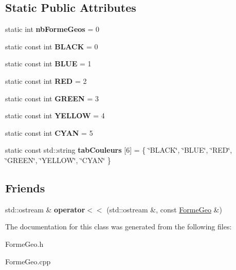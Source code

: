 \subsection*{Static Public Attributes}
\begin{DoxyCompactItemize}
\item 
\mbox{\label{class_forme_geo_a7def7d58284e2bcebd42da550aabed61}} 
static int {\bfseries nb\+Forme\+Geos} = 0
\item 
\mbox{\label{class_forme_geo_aaa9f666214acae24187d728f9b360604}} 
static const int {\bfseries B\+L\+A\+CK} = 0
\item 
\mbox{\label{class_forme_geo_a683d564c4ed1425a75efab32702c87db}} 
static const int {\bfseries B\+L\+UE} = 1
\item 
\mbox{\label{class_forme_geo_aa62b26e133ed4bb5d5ff06a453b616d8}} 
static const int {\bfseries R\+ED} = 2
\item 
\mbox{\label{class_forme_geo_af58c1c56fa63e46d4fb5860deb186c14}} 
static const int {\bfseries G\+R\+E\+EN} = 3
\item 
\mbox{\label{class_forme_geo_a910e643ce2be5fd38d7f707b3a86f538}} 
static const int {\bfseries Y\+E\+L\+L\+OW} = 4
\item 
\mbox{\label{class_forme_geo_a81475741848a25a3b05a87e067f68ea4}} 
static const int {\bfseries C\+Y\+AN} = 5
\item 
\mbox{\label{class_forme_geo_ac1c0a5f742f033116f4133703dcc23c8}} 
static const std\+::string {\bfseries tab\+Couleurs} \mbox{[}6\mbox{]} = \{ \char`\"{}B\+L\+A\+CK\char`\"{}, \char`\"{}B\+L\+UE\char`\"{}, \char`\"{}R\+ED\char`\"{}, \char`\"{}G\+R\+E\+EN\char`\"{}, \char`\"{}Y\+E\+L\+L\+OW\char`\"{}, \char`\"{}C\+Y\+AN\char`\"{} \}
\end{DoxyCompactItemize}
\subsection*{Friends}
\begin{DoxyCompactItemize}
\item 
\mbox{\label{class_forme_geo_a8a4eaf9eb2894e1a3c342e428170818b}} 
std\+::ostream \& {\bfseries operator$<$$<$} (std\+::ostream \&, const \mbox{\hyperlink{class_forme_geo}{Forme\+Geo}} \&)
\end{DoxyCompactItemize}


The documentation for this class was generated from the following files\+:\begin{DoxyCompactItemize}
\item 
Forme\+Geo.\+h\item 
Forme\+Geo.\+cpp\end{DoxyCompactItemize}
